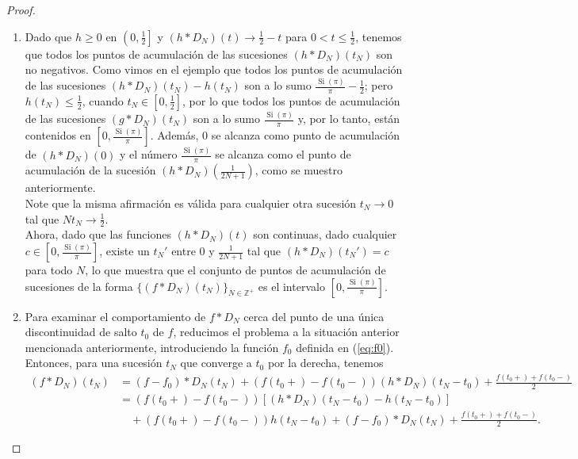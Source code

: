 \begin{proof}
  \begin{enumerate}
    \item Dado que \( h \geq 0 \) en \( \left( 0, \frac{1}{2} \right] \) y \( (h * D_N)(t) \to \frac{1}{2} - t \) para \( 0 < t \leq \frac{1}{2} \), tenemos que todos los puntos de acumulación de las sucesiones \( (h * D_N)(t_N) \) son no negativos. Como vimos en el ejemplo que todos los puntos de acumulación de las sucesiones \( (h * D_N)(t_N) - h(t_N) \) son a lo sumo \( \frac{\operatorname{Si}(\pi)}{\pi} - \frac{1}{2} \); pero \( h(t_N) \leq \frac{1}{2} \), cuando \( t_N \in [0, \frac{1}{2}] \), por lo que todos los puntos de acumulación de las sucesiones \( (g * D_N)(t_N) \) son a lo sumo \( \frac{\operatorname{Si}(\pi)}{\pi} \) y, por lo tanto, están contenidos en \( \left[0, \frac{\operatorname{Si}(\pi)}{\pi} \right] \). Además, \( 0 \) se alcanza como punto de acumulación de \( (h * D_N)(0) \) y el número \( \frac{\operatorname{Si}(\pi)}{\pi} \) se alcanza como el punto de acumulación de la sucesión \( (h * D_N) \left( \frac{1}{2N+1} \right) \), como se muestro anteriormente.\\
      Note que la misma afirmación es válida para cualquier otra sucesión \( t_N \to 0 \) tal que \( N t_N \to \frac{1}{2} \).\\
      Ahora, dado que las funciones \( (h * D_N)(t) \) son continuas, dado cualquier \( c \in \left[0, \frac{\operatorname{Si}(\pi)}{\pi} \right] \), existe un \( t_N' \) entre \( 0 \) y \( \frac{1}{2N+1} \) tal que \( (h * D_N)(t_N') = c \) para todo \( N \), lo que muestra que el conjunto de puntos de acumulación de sucesiones de la forma \( \{(f * D_N)(t_N)\}_{N \in \mathbb{Z}^+} \) es el intervalo \( \left[0, \frac{\operatorname{Si}(\pi)}{\pi} \right] \).
    \item Para examinar el comportamiento de \( f * D_N \) cerca del punto de una única discontinuidad de salto \( t_0 \) de \( f \), reducimos el problema a la situación anterior mencionada anteriormente, introduciendo la función \( f_0 \) definida en (\ref{eq:f0}). Entonces, para una sucesión \( t_N \) que converge a \( t_0 \) por la derecha, tenemos
      \begin{align*}
      (f * D_N)(t_N) &= (f - f_0) * D_N(t_N) + (f(t_0+) - f(t_0-)) (h * D_N)(t_N - t_0) + \frac{f(t_0+) + f(t_0-)}{2} \\
      &= (f(t_0+) - f(t_0-)) \left[(h * D_N)(t_N - t_0) - h(t_N - t_0) \right] \\
      &\quad + (f(t_0+) - f(t_0-)) h(t_N - t_0) + (f - f_0) * D_N (t_N) + \frac{f(t_0+) + f(t_0-)}{2}.

\end{align*}
\end{enumerate}
\end{proof}
